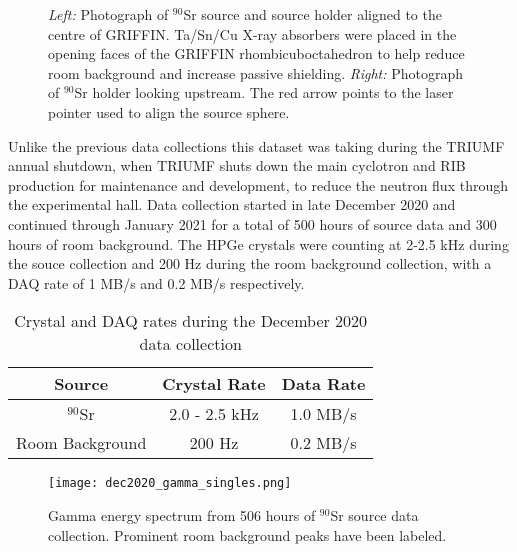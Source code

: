 \documentclass[cnatzke_thesis_proposal.tex]{subfiles}
\begin{document}
\begin{figure}[htbp]
  \centering
  \qquad
  \caption{
    \textit{Left:} Photograph of $^{90}$Sr source and source holder aligned to the centre of GRIFFIN. Ta/Sn/Cu X-ray absorbers were placed in the opening faces of the GRIFFIN rhombicuboctahedron to help reduce room background and increase passive shielding.
    \textit{Right:} Photograph of $^{90}$Sr holder looking upstream. The red arrow points to the laser pointer used to align the source sphere.
  }
  \label{fig:source_holder_in_griffin}
\end{figure}

Unlike the previous data collections this dataset was taking during the TRIUMF annual shutdown, when TRIUMF shuts down the main cyclotron and RIB production for maintenance and development, to reduce the neutron flux through the experimental hall. Data collection started in late December 2020 and continued through January 2021 for a total of 500 hours of source data and 300 hours of room background. The HPGe crystals were counting at 2-2.5 kHz during the souce collection and 200 Hz during the room background collection, with a DAQ rate of 1 MB/s and 0.2 MB/s respectively.

\begin{table}[]
  \begin{tabular}{c|cc}
  \textbf{Source} & \textbf{Crystal Rate} & \textbf{Data Rate} \\ \hline
  $^{90}$Sr       & 2.0 - 2.5 kHz         & 1.0 MB/s           \\
  Room Background & 200 Hz                & 0.2 MB/s          
  \end{tabular}
  \caption{Crystal and DAQ rates during the December 2020 data collection}
  \label{tab:dec2020_rates}
\end{table}



\begin{figure}[H]
  \centering
  \texttt{[image: dec2020\_gamma\_singles.png]}
  \caption{Gamma energy spectrum from 506 hours of $^{90}$Sr source data collection. Prominent room background peaks have been labeled.}
  \label{fig:dec2020_gamma_singles}
\end{figure}



\end{document}
